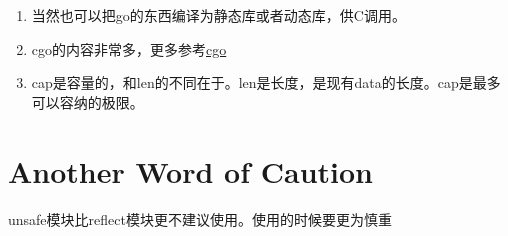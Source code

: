 \begin{enumerate}
\tightlist
\item
  当然也可以把go的东西编译为静态库或者动态库，供C调用。
\item
  cgo的内容非常多，更多参考\href{https://golang.org/cmd/cgo}{cgo}
\item
  cap是容量的，和len的不同在于。len是长度，是现有data的长度。cap是最多可以容纳的极限。
\end{enumerate}

\hypertarget{another-word-of-caution}{%
\section{Another Word of Caution}\label{another-word-of-caution}}

unsafe模块比reflect模块更不建议使用。使用的时候要更为慎重
